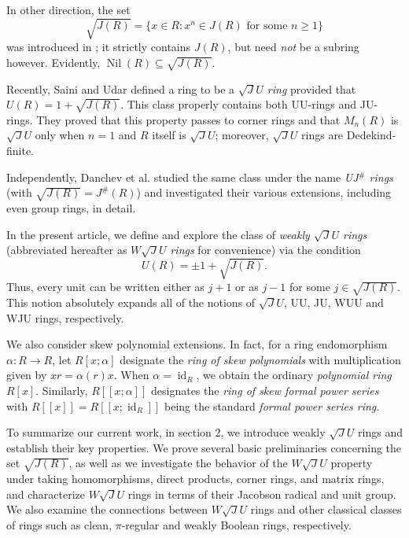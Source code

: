 \documentclass[12pt]{amsart}
\begin{document}
In other direction, the set \[ \sqrt{J(R)} = \{ x \in R : x^{n} \in J(R) \text{ for some } n \ge 1 \} \] was
introduced in \cite{wang}; it strictly contains \( J(R) \), but need {\it not} be a subring however. Evidently, \( \operatorname{Nil}(R) \subseteq \sqrt{J(R)} \).

Recently, Saini and Udar \cite{SU} defined a ring to be a \textit{\(\sqrt{J}U\) ring} provided that \( U(R) = 1 + \sqrt{J(R)} \). This class properly contains both UU-rings and JU-rings. They proved that this property passes to corner rings and that \( M_{n}(R) \) is \(\sqrt{J}U\) only when \( n=1 \) and \( R \) itself
is \(\sqrt{J}U\); moreover, \(\sqrt{J}U\) rings are Dedekind-finite.

Independently, Danchev et al. \cite{DDE} studied the same class under the name \textit{UJ\(^\#\) rings} (with \( \sqrt{J(R)} = J^{\#}(R) \)) and investigated their various extensions, including even group rings, in detail.

In the present article, we define and explore the class of \textit{weakly \(\sqrt{J}U\) rings} (abbreviated hereafter as \textit{\(W\sqrt{J}U\) rings} for convenience) via the condition \[ U(R) = \pm 1 + \sqrt{J(R)}. \] Thus, every unit can be written either as \( j+1 \) or as \( j-1 \) for some \( j \in \sqrt{J(R)} \). This notion absolutely expands all of the notions of \(\sqrt{J}U\), UU, JU, WUU and WJU rings, respectively.

We also consider skew polynomial extensions. In fact, for a ring endomorphism \( \alpha : R \to R \), let \( R[x;\alpha] \) designate the {\it ring of skew polynomials} with multiplication given by \( xr = \alpha(r)x \). When \( \alpha = \operatorname{id}_R \), we obtain the ordinary {\it polynomial ring} \( R[x] \). Similarly, \( R[[x;\alpha]] \) designates the {\it ring of skew formal power series} with \( R[[x]] = R[[x;\operatorname{id}_R]] \) being the standard {\it formal power series ring}.

To summarize our current work, in section 2, we introduce weakly \(\sqrt{J}U\) rings and establish their key properties. We prove several basic preliminaries concerning the set \(\sqrt{J(R)}\), as well as we investigate the behavior of the \(W\sqrt{J}U\) property under taking homomorphisms, direct products, corner rings, and matrix rings, and characterize \(W\sqrt{J}U\) rings in terms of their Jacobson radical and unit group. We also examine the connections between \(W\sqrt{J}U\) rings and other classical classes of rings such as clean, \(\pi\)-regular and weakly Boolean rings, respectively.
\end{document}
